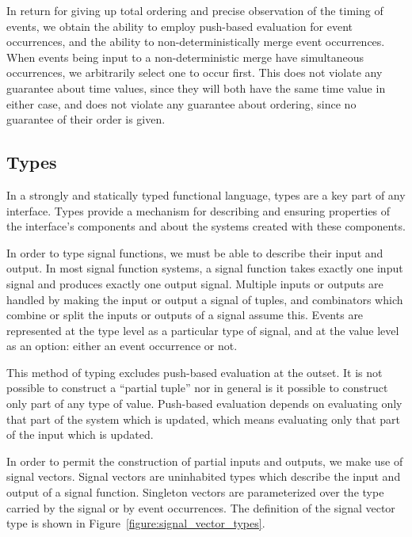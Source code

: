 In return for giving up total ordering and precise observation of the timing of events, we obtain the
ability to employ push-based evaluation for event occurrences, and the ability to non-deterministically
merge event occurrences. When events being input to a non-deterministic merge have simultaneous occurrences,
we arbitrarily select one to occur first. This does not violate any guarantee about time values, since
they will both have the same time value in either case, and does not violate any guarantee about ordering,
since no guarantee of their order is given.

\subsection{Types}
\label{subsection:System_Design_and_Interface-Types}

In a strongly and statically typed functional language, types are a key part of
any interface. Types provide a mechanism for describing and ensuring properties
of the interface's components and about the systems created with these
components. 

In order to type signal functions, we must be able to describe their input and
output. In most signal function systems, a signal function takes exactly one
input signal and produces exactly one output signal. Multiple inputs or outputs are handled
by making the input or output a signal of tuples, and combinators which combine or split
the inputs or outputs of a signal assume this.  Events are represented at the
type level as a particular type of signal, and at the value level as an option:
either an event occurrence or not. 

This method of typing excludes push-based evaluation at the outset.
It is not possible to construct a ``partial tuple'' nor in general is it
possible to construct only part of any type of value. Push-based evaluation
depends on evaluating only that part of the system which is updated, which means
evaluating only that part of the input which is updated.

In order to permit the construction of partial inputs and outputs, we make use
of signal vectors. Signal vectors are uninhabited types which describe the input
and output of a signal function. Singleton vectors are parameterized over the
type carried by the signal or by event occurrences. The definition of the signal
vector type is shown in Figure~\ref{figure:signal_vector_types}. 

